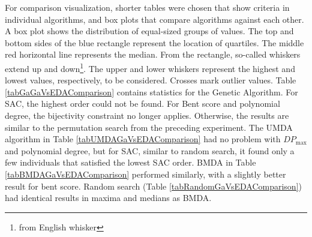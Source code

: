 For comparison visualization, shorter tables were chosen that show
criteria in individual algorithms, and box plots that compare
algorithms against each other. A box plot shows the distribution of equal-sized groups of values.
The top and bottom sides of the blue rectangle represent the location of quartiles. The middle red
horizontal line represents the median. From the rectangle, so-called whiskers extend up and down\footnote{from English whisker}.
The upper and lower whiskers represent the highest and lowest values, respectively, to be considered.
Crosses mark outlier values.
Table \ref{tabGaGaVsEDAComparison} contains statistics for the Genetic Algorithm.
For SAC, the highest order could not be found. For Bent score and polynomial degree, the
bijectivity constraint no longer applies. Otherwise, the results are similar to the permutation search from the preceding
experiment. The UMDA algorithm in Table \ref{tabUMDAGaVsEDAComparison}
had no problem with $DP_{\max}$ and polynomial degree, but for SAC, similar to random search,
it found only a few individuals that satisfied the lowest SAC order.
BMDA in Table \ref{tabBMDAGaVsEDAComparison} performed similarly, with a slightly better result
for bent score. Random search (Table \ref{tabRandomGaVsEDAComparison}) had identical results in maxima and medians as
BMDA.


